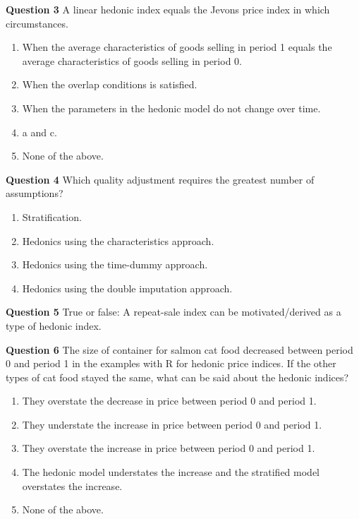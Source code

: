 \documentclass[
]{article}
\begin{document}
\textbf{Question 3} A linear hedonic index equals the Jevons price index in which circumstances.

\begin{enumerate}
\def\labelenumi{\alph{enumi})}
\item
  When the average characteristics of goods selling in period 1 equals the average characteristics of goods selling in period 0.
\item
  When the overlap conditions is satisfied.
\item
  When the parameters in the hedonic model do not change over time.
\item
  a and c.
\item
  None of the above.
\end{enumerate}

\textbf{Question 4} Which quality adjustment requires the greatest number of assumptions?

\begin{enumerate}
\def\labelenumi{\alph{enumi})}
\item
  Stratification.
\item
  Hedonics using the characteristics approach.
\item
  Hedonics using the time-dummy approach.
\item
  Hedonics using the double imputation approach.
\end{enumerate}

\textbf{Question 5} True or false: A repeat-sale index can be motivated/derived as a type of hedonic index.

\textbf{Question 6} The size of container for salmon cat food decreased between period 0 and period 1 in the examples with R for hedonic price indices. If the other types of cat food stayed the same, what can be said about the hedonic indices?

\begin{enumerate}
\def\labelenumi{\alph{enumi})}
\item
  They overstate the decrease in price between period 0 and period 1.
\item
  They understate the increase in price between period 0 and period 1.
\item
  They overstate the increase in price between period 0 and period 1.
\item
  The hedonic model understates the increase and the stratified model overstates the increase.
\item
  None of the above.
\end{enumerate}
\end{document}
